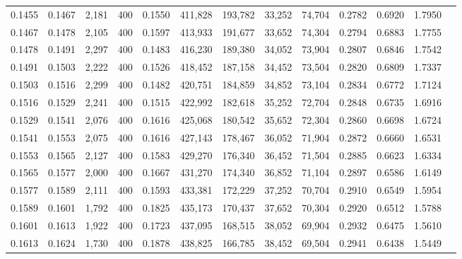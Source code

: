\begin{tabular}{rrrrrrrrrrrrr}
0.1455 & 0.1467 &  2,181 & 400 &                                     0.1550 & 411,828 & 193,782 &  33,252 &  74,704 & 0.2782 & 0.6920 & 1.7950 \\
0.1467 & 0.1478 &  2,105 & 400 &                                     0.1597 & 413,933 & 191,677 &  33,652 &  74,304 & 0.2794 & 0.6883 & 1.7755 \\
0.1478 & 0.1491 &  2,297 & 400 &                                     0.1483 & 416,230 & 189,380 &  34,052 &  73,904 & 0.2807 & 0.6846 & 1.7542 \\
0.1491 & 0.1503 &  2,222 & 400 &                                     0.1526 & 418,452 & 187,158 &  34,452 &  73,504 & 0.2820 & 0.6809 & 1.7337 \\
0.1503 & 0.1516 &  2,299 & 400 &                                     0.1482 & 420,751 & 184,859 &  34,852 &  73,104 & 0.2834 & 0.6772 & 1.7124 \\
0.1516 & 0.1529 &  2,241 & 400 &                                     0.1515 & 422,992 & 182,618 &  35,252 &  72,704 & 0.2848 & 0.6735 & 1.6916 \\
0.1529 & 0.1541 &  2,076 & 400 &                                     0.1616 & 425,068 & 180,542 &  35,652 &  72,304 & 0.2860 & 0.6698 & 1.6724 \\
0.1541 & 0.1553 &  2,075 & 400 &                                     0.1616 & 427,143 & 178,467 &  36,052 &  71,904 & 0.2872 & 0.6660 & 1.6531 \\
0.1553 & 0.1565 &  2,127 & 400 &                                     0.1583 & 429,270 & 176,340 &  36,452 &  71,504 & 0.2885 & 0.6623 & 1.6334 \\
0.1565 & 0.1577 &  2,000 & 400 &                                     0.1667 & 431,270 & 174,340 &  36,852 &  71,104 & 0.2897 & 0.6586 & 1.6149 \\
0.1577 & 0.1589 &  2,111 & 400 &                                     0.1593 & 433,381 & 172,229 &  37,252 &  70,704 & 0.2910 & 0.6549 & 1.5954 \\
0.1589 & 0.1601 &  1,792 & 400 &                                     0.1825 & 435,173 & 170,437 &  37,652 &  70,304 & 0.2920 & 0.6512 & 1.5788 \\
0.1601 & 0.1613 &  1,922 & 400 &                                     0.1723 & 437,095 & 168,515 &  38,052 &  69,904 & 0.2932 & 0.6475 & 1.5610 \\
0.1613 & 0.1624 &  1,730 & 400 &                                     0.1878 & 438,825 & 166,785 &  38,452 &  69,504 & 0.2941 & 0.6438 & 1.5449 \\

\end{tabular}
